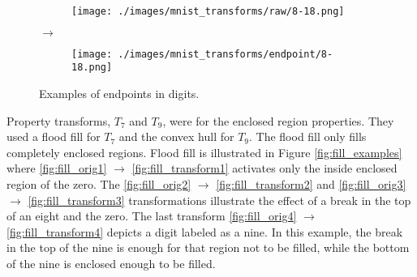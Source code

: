 \begin{figure}[H]
    \par\medskip

    \begin{subfigure}{.15\columnwidth}
        \centering
        \texttt{[image: ./images/mnist\_transforms/raw/8-18.png]}
        \caption{}
        \label{fig:endpoint_orig4}
    \end{subfigure}%
    $\rightarrow$
    \begin{subfigure}{.15\columnwidth}
        \centering
        \texttt{[image: ./images/mnist\_transforms/endpoint/8-18.png]}
        \caption{}
        \label{fig:endpoint_transform4}
    \end{subfigure}

    \caption{Examples of endpoints in digits.}
    \label{fig:endpoint_examples}
\end{figure}

Property transforms, $T_7$ and $T_9$, were for the enclosed region properties.
They used a flood fill for $T_7$ and the convex hull for $T_9$. The flood fill
only fills completely enclosed regions. Flood fill is illustrated in Figure
\ref{fig:fill_examples} where \ref{fig:fill_orig1} $\rightarrow$
\ref{fig:fill_transform1} activates only the inside enclosed region of the zero.
The \ref{fig:fill_orig2} $\rightarrow$ \ref{fig:fill_transform2} and
\ref{fig:fill_orig3} $\rightarrow$ \ref{fig:fill_transform3} transformations
illustrate the effect of a break in the top of an eight and the zero. The last
transform \ref{fig:fill_orig4} $\rightarrow$ \ref{fig:fill_transform4} depicts a
digit labeled as a nine. In this example, the break in the top of the nine is
enough for that region not to be filled, while the bottom of the nine is
enclosed enough to be filled.

